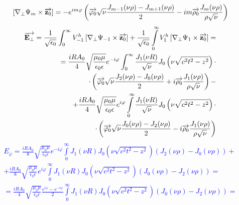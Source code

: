 %
\textcolor{blue} { \begin{equation*} \begin{aligned}
\left[  \nabla_\perp \Psi_m  \times  \overrightarrow{\mathbf z_0}  \right] = 
- e^{im\varphi} \left( \overrightarrow{\mathbf \varphi_0} \sqrt{\nu} 
\frac{J_{m-1} (\nu \rho) - J_{m+1} (\nu \rho)}{2} - 
i m \overrightarrow{\mathbf \rho_0} \frac{J_m (\nu \rho)}{ \rho \sqrt{\nu}} \right)
\end{aligned} \end{equation*} }
%
\textcolor{blue} { \begin{equation*} \begin{aligned}
\overrightarrow{\mathbf E_\perp} = \frac{1}{\sqrt{\epsilon_0}} \int_{0}^{\infty} 
V_{-1}^h \left[  \nabla_\perp \Psi_{-1}   \times  \overrightarrow{\mathbf z_0}  \right] +
\frac{1}{\sqrt{\epsilon_0}} \int \limits_{0}^{\infty} 
V_{1}^h \left[  \nabla_\perp \Psi_{1}  \times  \overrightarrow{\mathbf z_0}  \right] = \\
= \frac{i R A_0}{4} \sqrt{\frac{\mu_0 \mu}{\epsilon_0 \epsilon}} 
e^{- i \varphi} \int_{0}^{\infty} \frac{J_1 (\nu R)}{\sqrt{\nu}} 
J_0 \left( \nu \sqrt{c^2 t^2 - z^2} \right) \cdot \\
\cdot \left( \overrightarrow{\mathbf \varphi_0} \sqrt{\nu} 
\frac{J_2 (\nu \rho) - J_0 (\nu \rho)}{2} +
i \overrightarrow{\mathbf \rho_0} \frac{J_1 (\nu \rho)}{ \rho \sqrt{\nu}} \right) - \\
+ \frac{i R A_0}{4} \sqrt{\frac{\mu_0 \mu}{\epsilon_0 \epsilon}}
e^{i \varphi} \int \limits_{0}^{\infty} \frac{J_1 (\nu R)}{ \sqrt{\nu}}
J_0 \left( \nu \sqrt{c^2 t^2 - z^2} \right) \cdot \\
\cdot \left( \overrightarrow{\mathbf \varphi_0} \sqrt{\nu}
\frac{J_0 (\nu \rho) - J_2 (\nu \rho)}{2} - 
i \overrightarrow{\mathbf \rho_0} \frac{J_1 (\nu \rho)}{ \rho \sqrt{\nu}} \right)
\end{aligned} \end{equation*} }
%
\textcolor{blue} { \begin{equation*} \begin{aligned}
E_\varphi = \frac{i R A_0}{8} \sqrt{\frac{\mu_0 \mu}{\epsilon_0 \epsilon}} 
e^{-i \varphi} \int \limits_{0}^{\infty} J_1 (\nu R)
J_0 \left( \nu \sqrt{c^2 t^2 - z^2} \right)
\left( J_2 (\nu \rho) - J_0 (\nu \rho) \right) + \\
+ \frac{i R A_0}{8} \sqrt{\frac{\mu_0 \mu}{\epsilon_0 \epsilon}} 
e^{i \varphi} \int \limits_{0}^{\infty} J_1 (\nu R)
J_0 \left( \nu \sqrt{c^2 t^2 - z^2} \right)
\left( J_0 (\nu \rho) - J_2 (\nu \rho) \right) = \\
= \frac{i R A_0}{4} \sqrt{\frac{\mu_0 \mu}{\epsilon_0 \epsilon}}
\frac{e^{i \varphi} - e^{-i \varphi} }{2} \int \limits_{0}^{\infty} 
J_1 (\nu R) J_0 \left( \nu \sqrt{c^2 t^2 - z^2} \right) 
\left( J_0 (\nu \rho) - J_2 (\nu \rho) \right) =
\end{aligned} \end{equation*} }
